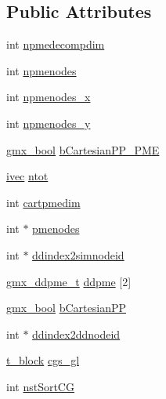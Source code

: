 \subsection*{\-Public \-Attributes}
\begin{DoxyCompactItemize}
\item 
int \hyperlink{structgmx__domdec__comm_a4266b69904a51f7ca51d76e54f3a32e2}{npmedecompdim}
\item 
int \hyperlink{structgmx__domdec__comm_aefa60e54f8499d789020003e4df2f376}{npmenodes}
\item 
int \hyperlink{structgmx__domdec__comm_ae2187282d3ca261a72a76d8cee2a323e}{npmenodes\-\_\-x}
\item 
int \hyperlink{structgmx__domdec__comm_ab8c655cb1d4a96c393f99e676bf9f2b8}{npmenodes\-\_\-y}
\item 
\hyperlink{include_2types_2simple_8h_a8fddad319f226e856400d190198d5151}{gmx\-\_\-bool} \hyperlink{structgmx__domdec__comm_a67e8ff6bfed30b063bbcc25f7f5114cf}{b\-Cartesian\-P\-P\-\_\-\-P\-M\-E}
\item 
\hyperlink{share_2template_2gromacs_2types_2simple_8h_a74f6ffdb4a9c1764f5293969d8c681b6}{ivec} \hyperlink{structgmx__domdec__comm_a0ebc6cdbd981e37af18aeed99e67e04b}{ntot}
\item 
int \hyperlink{structgmx__domdec__comm_a8062adc79767702a00ea92d69608e2bd}{cartpmedim}
\item 
int $\ast$ \hyperlink{structgmx__domdec__comm_aa6f64f36e627a639ed92e3c2c71931d4}{pmenodes}
\item 
int $\ast$ \hyperlink{structgmx__domdec__comm_a3675d682330ecb348c65b92addc8ce01}{ddindex2simnodeid}
\item 
\hyperlink{structgmx__ddpme__t}{gmx\-\_\-ddpme\-\_\-t} \hyperlink{structgmx__domdec__comm_ac7cd816515cad0638e505dfd7014cd20}{ddpme} \mbox{[}2\mbox{]}
\item 
\hyperlink{include_2types_2simple_8h_a8fddad319f226e856400d190198d5151}{gmx\-\_\-bool} \hyperlink{structgmx__domdec__comm_a546b4c04d4910bf02d00782726346391}{b\-Cartesian\-P\-P}
\item 
int $\ast$ \hyperlink{structgmx__domdec__comm_a75254e254cb11a868c01f7495016afee}{ddindex2ddnodeid}
\item 
\hyperlink{structt__block}{t\-\_\-block} \hyperlink{structgmx__domdec__comm_a8f64e1e608cf9b9a9f3552b1d37d7e23}{cgs\-\_\-gl}
\item 
int \hyperlink{structgmx__domdec__comm_aba605422f38c48c6801f8d3ea6dee695}{nst\-Sort\-C\-G}
\item 

\end{DoxyCompactItemize}

